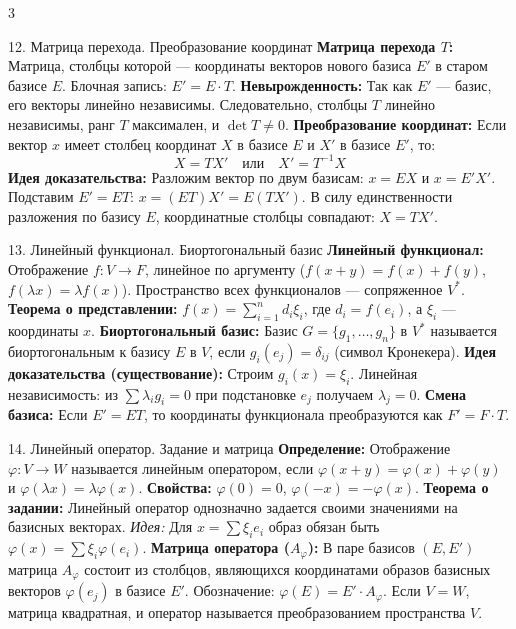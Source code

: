 \documentclass[8pt, a4paper, landscape]{extarticle}
\begin{document}
\begin{multicols*}{3}
\begin{ticket}{12. Матрица перехода. Преобразование координат}
\textbf{Матрица перехода $T$:} Матрица, столбцы которой --- координаты векторов нового базиса $E'$ в старом базисе $E$. 
Блочная запись: $E' = E \cdot T$.
\textbf{Невырожденность:} Так как $E'$ --- базис, его векторы линейно независимы. Следовательно, столбцы $T$ линейно независимы, ранг $T$ максимален, и $\det T \neq 0$.
\tcblower
\textbf{Преобразование координат:} 
Если вектор $x$ имеет столбец координат $X$ в базисе $E$ и $X'$ в базисе $E'$, то:
\[X = T X' \quad \text{или} \quad X' = T^{-1} X\]
\textbf{Идея доказательства:}
Разложим вектор по двум базисам: $x = EX$ и $x = E'X'$.
Подставим $E' = ET$: $x = (ET)X' = E(TX')$. 
В силу единственности разложения по базису $E$, координатные столбцы совпадают: $X = TX'$.
\end{ticket}

\begin{ticket}{13. Линейный функционал. Биортогональный базис}
\textbf{Линейный функционал:} Отображение $f: V \to F$, линейное по аргументу ($f(x+y)=f(x)+f(y)$, $f(\lambda x)=\lambda f(x)$). 
Пространство всех функционалов --- сопряженное $V^*$.
\textbf{Теорема о представлении:} $f(x) = \sum_{i=1}^n d_i \xi_i$, где $d_i = f(e_i)$, а $\xi_i$ --- координаты $x$.
\tcblower
\textbf{Биортогональный базис:} Базис $G = \{g_1, \dots, g_n\}$ в $V^*$ называется биортогональным к базису $E$ в $V$, если $g_i(e_j) = \delta_{ij}$ (символ Кронекера).
\textbf{Идея доказательства (существование):}
Строим $g_i(x) = \xi_i$. Линейная независимость: из $\sum \lambda_i g_i = 0$ при подстановке $e_j$ получаем $\lambda_j = 0$. 
\textbf{Смена базиса:} Если $E' = ET$, то координаты функционала преобразуются как $F' = F \cdot T$.
\end{ticket}

\begin{ticket}{14. Линейный оператор. Задание и матрица}
\textbf{Определение:} Отображение $\varphi: V \to W$ называется линейным оператором, если $\varphi(x+y)=\varphi(x)+\varphi(y)$ и $\varphi(\lambda x)=\lambda\varphi(x)$.
\textbf{Свойства:} $\varphi(0) = 0$, $\varphi(-x) = -\varphi(x)$.
\textbf{Теорема о задании:} Линейный оператор однозначно задается своими значениями на базисных векторах. 
\textit{Идея:} Для $x = \sum \xi_i e_i$ образ обязан быть $\varphi(x) = \sum \xi_i \varphi(e_i)$.
\tcblower
\textbf{Матрица оператора ($A_\varphi$):} 
В паре базисов $(E, E')$ матрица $A_\varphi$ состоит из столбцов, являющихся координатами образов базисных векторов $\varphi(e_j)$ в базисе $E'$.
Обозначение: $\varphi(E) = E' \cdot A_\varphi$.
Если $V=W$, матрица квадратная, и оператор называется преобразованием пространства $V$.
\end{ticket}


\end{multicols*}
\end{document}
